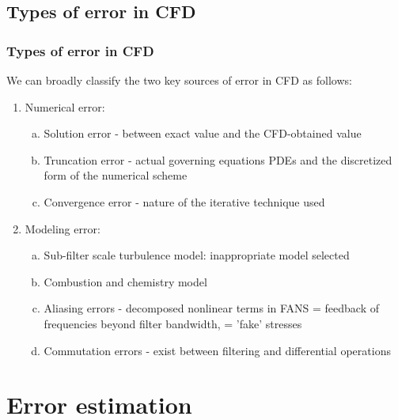 \documentclass{beamer}
\begin{document}
\subsection{Types of error in CFD}
\begin{frame}%
\frametitle{Types of error in CFD}
\scriptsize
We can broadly classify the two key sources of error in CFD as follows:

\begin{enumerate}[1.]
\item Numerical error:
	\begin{enumerate}[(a)]
	\scriptsize
	\item Solution error - between exact value and the CFD-obtained value
	\item Truncation error - actual governing equations PDEs and the discretized form of the numerical scheme
	\item Convergence error - nature of the iterative technique used
	\end{enumerate}
\item Modeling error:
	\begin{enumerate}[(a)]
	\scriptsize
	\item Sub-filter scale turbulence model: inappropriate model selected
	\item Combustion and chemistry model
	\item Aliasing errors - decomposed nonlinear terms in FANS = feedback of frequencies beyond filter bandwidth, = 'fake' stresses 
	\item Commutation errors - exist between filtering and differential operations 
	\end{enumerate}
\end{enumerate}

\end{frame}





\section[Error estimates]{Error estimation}
\end{document}
